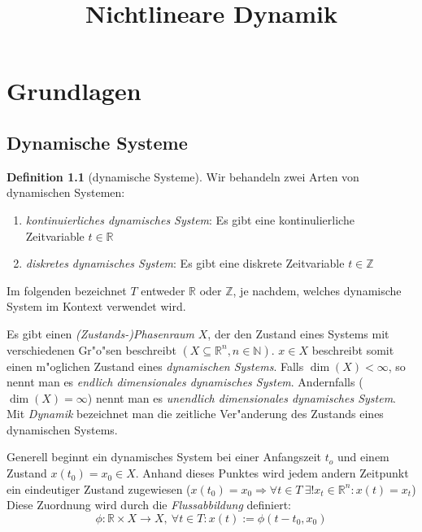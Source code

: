 \documentclass[a4paper, 13pt]{scrreprt}
\theoremstyle{definition} \newtheorem{definition}{Definition}[section]
\begin{document}
\title{Nichtlineare Dynamik}
\publishers{\small{Fehler in der Mitschrift an
\url{alexander.book@gmx.de}} oder 
\url{dominik.o@gmx.net}}
\maketitle
\tableofcontents


\chapter{Grundlagen}
\section{Dynamische Systeme}
\begin{definition}[dynamische Systeme]
Wir behandeln zwei Arten von dynamischen Systemen:
\begin{enumerate}
\item \emph{kontinuierliches dynamisches System}: Es gibt eine kontinulierliche Zeitvariable $t\in\mathbb{R}$
\item \emph{diskretes dynamisches System}: Es gibt eine diskrete Zeitvariable $t\in\mathbb{Z}$
\end{enumerate}
Im folgenden bezeichnet $T$ entweder $\mathbb{R}$ oder $\mathbb{Z}$, je nachdem, welches dynamische System im Kontext verwendet wird.

Es gibt einen \emph{(Zustands-)Phasenraum} $X$, der den Zustand eines Systems mit verschiedenen Gr"o"sen beschreibt $(X\subseteq \mathbb{R}^n, n\in \mathbb{N})$. $x\in X$ beschreibt somit einen m"oglichen Zustand eines \emph{dynamischen Systems}. Falls $\operatorname{dim}(X) < \infty$, so nennt man es \emph{endlich dimensionales dynamisches System}. Andernfalls ($\operatorname{dim}(X) = \infty$) nennt man es \emph{unendlich dimensionales dynamisches System}. Mit \emph{Dynamik} bezeichnet man die zeitliche Ver"anderung des Zustands eines dynamischen Systems.
\end{definition}


Generell beginnt ein dynamisches System bei einer Anfangszeit $t_o$ und einem Zustand $x(t_0) = x_0 \in X$. Anhand dieses Punktes wird jedem andern Zeitpunkt ein eindeutiger Zustand zugewiesen ($x(t_0) = x_0 \Rightarrow \forall t\in T\  \exists! x_t\in\mathbb{R}^n: x(t) = x_t$)
Diese Zuordnung wird durch die \emph{Flussabbildung} definiert:
$$\phi\colon \mathbb{R}\times X\to X, \ \forall t \in T: x(t):= \phi(t-t_0, x_0) $$
\end{document}
